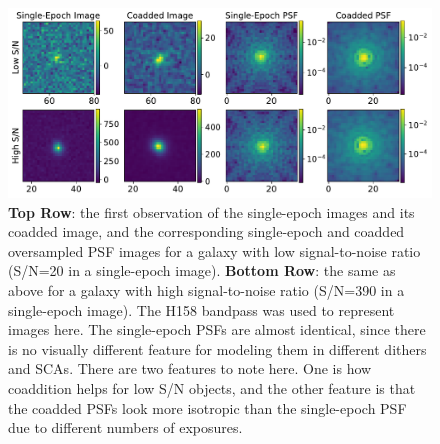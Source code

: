 \documentclass[fleqn,usenatbib]{mnras}
\begin{document}
\begin{figure}
	\includegraphics[width=\textwidth]{lowsnr_highsnr_galaxies_v2.pdf}
    \caption{\textbf{Top Row}: the first observation of the single-epoch images and its coadded image, and the corresponding single-epoch and coadded oversampled PSF images for a galaxy with low signal-to-noise ratio (S/N=20 in a single-epoch image). \textbf{Bottom Row}: the same as above for a galaxy with high signal-to-noise ratio (S/N=390 in a single-epoch image). The H158 bandpass was used to represent images here. The single-epoch PSFs are almost identical, since there is no visually different feature for modeling them in different dithers and SCAs. There are two features to note here. One is how coaddition helps for low S/N objects, and the other feature is that the coadded PSFs look more isotropic than the single-epoch PSF due to different numbers of exposures.}
    \label{fig:singlecoadd}
\end{figure}
\end{document}
